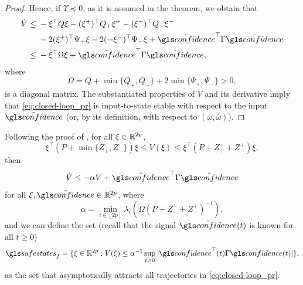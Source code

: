 \begin{proof}
	Hence, if $\Upsilon\preceq0$, as it is assumed in the theorem, we
	obtain that
	\begin{align*}
		\dot{V}  \leq {} & -\xi^{\top}Q\xi-(\xi^{+})^{\top}Q_{+}\xi^{+}-(\xi^{-})^{\top}Q_{-}\xi^{-}\\
		 & -2(\xi^{+})^{\top}\Psi_{+}\xi-2(-\xi^{-})^{\top}\Psi_{-}\xi+\tilde{\confidence}^{\top}\Gamma\tilde{\confidence}\\
		 \leq {} & -\xi^{\top}\Omega\xi+\tilde{\confidence}^{\top}\Gamma\tilde{\confidence},
	\end{align*}
	where
	\[
	\Omega=Q+\min\{Q_{+},Q_{-}\}+2\min\{\Psi_{+},\Psi_{-}\}>0,
	\]
	is a diagonal matrix. The substantiated properties of $V$ and its
	derivative imply that \eqref{eq:closed-loop_pr} is input-to-state
	stable \citep{Sontag:01:Springer,Dashkovskiy:11:AiT} with respect
	to the input $\tilde{\confidence}$ (or, by its definition, with respect
	to $(\underline{\omega},\overline{\omega})$).
\end{proof}
Following the proof of , for all $\xi\in\mathbb{R}^{2p}$,
\[
\xi^{\top}(P+\min\{Z_{+},Z_{-}\})\xi\leq V(\xi)\leq\xi^{\top}(P+Z_{+}^{+}+Z_{-}^{+})\xi,
\]
then
\[
\dot{V}\leq-\alpha V+\tilde{\confidence}^{\top}\Gamma\tilde{\confidence}
\]
for all $\xi,\tilde{\confidence}\in\Real^{2p}$, where
\[
\alpha=\min_{i\in[2p]}\lambda_{i}\left(\Omega(P+Z_{+}^{+}+Z_{-}^{+})^{-1}\right),
\]
and we can define the set (recall that the signal $\tilde{\confidence}(t)$
is known for all $t\geq0$)
\begin{equation}
\safestates_{f}=\{\xi\in\Real^{2p}:V(\xi)\leq\alpha^{-1}\sup_{t\geq0}|\tilde{\confidence}^{\top}(t)\Gamma\tilde{\confidence}(t)|\},\label{eq:X_f}
\end{equation}
as the set that asymptotically attracts all trajectories in \eqref{eq:closed-loop_pr}.

